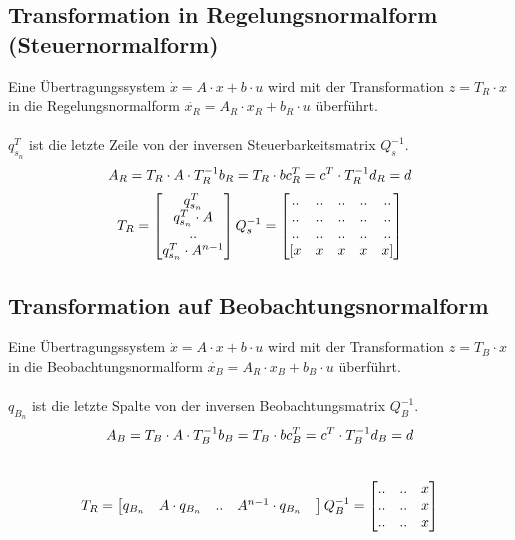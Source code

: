 \subsection{Transformation in Regelungsnormalform (Steuernormalform)}
Eine Übertragungssystem $\dot{x}=A\cdot x +  b \cdot u$ wird mit der Transformation $z=T_R\cdot x$ in die Regelungsnormalform  $\dot{x_R}=A_R\cdot x_R +  b_R \cdot u$ überführt.\\
\\
$q_{s_n}^T$ ist die letzte Zeile von der inversen Steuerbarkeitsmatrix $Q_s^{-1}$.
\[
	A_R = T_R\cdot A \cdot T_R^{-1}	\\	b_R = T_R\cdot b	\\	c_R^T = c^T\cdot T_R^{-1}	\\	d_R = d
\]
\[
	T_R=
	\begin{bmatrix}
		q_{s_n}^T \\
		q_{s_n}^T \cdot A \\
		.. \\
		q_{s_n}^T \cdot A^{n-1}\\	
	\end{bmatrix}	\\
	Q_s^{-1} =
	\begin{bmatrix}
			.. &	.. & .. & .. & ..\\
			.. &	.. & .. & .. & ..\\
			.. &	.. & .. & .. & ..\\
			 [x &	x & x & x & x]  \\	 
	\end{bmatrix}
\]

\subsection{Transformation auf Beobachtungsnormalform}
Eine Übertragungssystem $\dot{x}=A\cdot x +  b \cdot u$ wird mit der Transformation  $z=T_B\cdot x$ in die Beobachtungsnormalform $\dot{x_B}=A_R\cdot x_B +  b_B \cdot u$ überführt.\\
\\
$q_{B_n}$ ist die letzte Spalte von der inversen Beobachtungsmatrix $Q_B^{-1}$.
\\
\[
	A_B = T_B\cdot A \cdot T_B^{-1}	\\	b_B = T_B\cdot b	\\	c_B^T = c^T\cdot T_B^{-1}	\\	d_B = d
\]
\\
\[
	T_R=
	\begin{bmatrix}
		q_{B_n} & A\cdot q_{B_n} &  ..& A^{n-1}\cdot q_{B_n} & \\
	\end{bmatrix}	\\
	Q_B^{-1} =
	\begin{bmatrix}
			 .. & .. & x\\
			 .. & .. & x\\
			 .. & .. & x\\	 
	\end{bmatrix}
\]